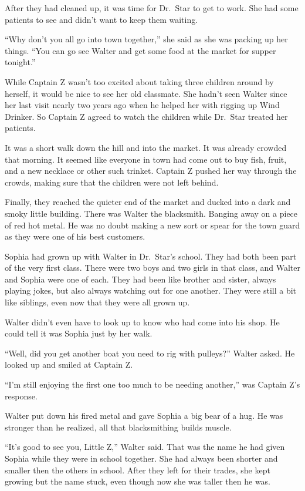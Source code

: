 \documentclass[12pt]{extbook}
\begin{document}
  After they had cleaned up, it was time for Dr.~Star to get to work. She
  had some patients to see and didn't want to keep them waiting.
  
  \enquote{Why don't you all go into town together,} she said as she was
  packing up her things. \enquote{You can go see Walter and get some food
  at the market for supper tonight.}
  
  While Captain Z wasn't too excited about taking three children around by
  herself, it would be nice to see her old classmate. She hadn't seen
  Walter since her last visit nearly two years ago when he helped her with
  rigging up Wind Drinker. So Captain Z agreed to watch the children while
  Dr.~Star treated her patients.
  
  It was a short walk down the hill and into the market. It was already
  crowded that morning. It seemed like everyone in town had come out to
  buy fish, fruit, and a new necklace or other such trinket. Captain Z
  pushed her way through the crowds, making sure that the children were
  not left behind.
  
  Finally, they reached the quieter end of the market and ducked into a
  dark and smoky little building. There was Walter the blacksmith. Banging
  away on a piece of red hot metal. He was no doubt making a new sort or
  spear for the town guard as they were one of his best customers.
  
  Sophia had grown up with Walter in Dr.~Star's school. They had both been
  part of the very first class. There were two boys and two girls in that
  class, and Walter and Sophia were one of each. They had been like
  brother and sister, always playing jokes, but also always watching out
  for one another. They were still a bit like siblings, even now that they
  were all grown up.
  
  Walter didn't even have to look up to know who had come into his shop.
  He could tell it was Sophia just by her walk.
  
  \enquote{Well, did you get another boat you need to rig with pulleys?}
  Walter asked. He looked up and smiled at Captain Z.
  
  \enquote{I'm still enjoying the first one too much to be needing
  another,} was Captain Z's response.
  
  Walter put down his fired metal and gave Sophia a big bear of a hug. He
  was stronger than he realized, all that blacksmithing builds muscle.
  
  \enquote{It's good to see you, Little Z,} Walter said. That was the name
  he had given Sophia while they were in school together. She had always
  been shorter and smaller then the others in school. After they left for
  their trades, she kept growing but the name stuck, even though now she
  was taller then he was.
  
\end{document}
